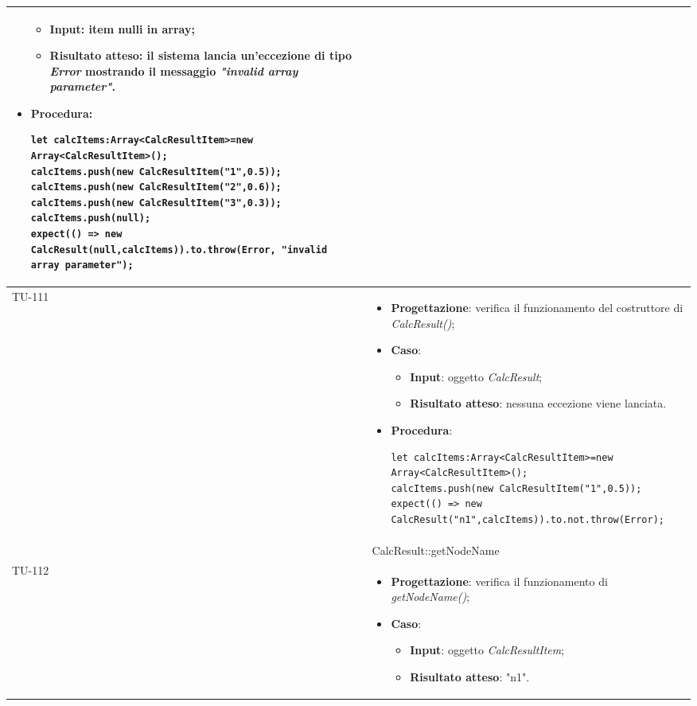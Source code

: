 \begin{longtable}{|C{1.5cm}|C{14.5cm}|}
\begin{itemize}
\begin{itemize}
		\item \textbf{Input}: item nulli in array;
		\item \textbf{Risultato atteso}: il sistema lancia un'eccezione di tipo \emph{Error} mostrando il messaggio \emph{"invalid array parameter"}.
	\end{itemize}
	\item \textbf{Procedura}:
	\begin{lstlisting}
let calcItems:Array<CalcResultItem>=new Array<CalcResultItem>();
calcItems.push(new CalcResultItem("1",0.5));
calcItems.push(new CalcResultItem("2",0.6));
calcItems.push(new CalcResultItem("3",0.3));
calcItems.push(null);
expect(() => new CalcResult(null,calcItems)).to.throw(Error, "invalid array parameter");
	\end{lstlisting}
\end{itemize}\\
\hline
{TU-111} &
\begin{itemize}
	\item \textbf{Progettazione}: verifica il funzionamento del costruttore di \emph{CalcResult()};
	\item \textbf{Caso}: 
	\begin{itemize}
		\item \textbf{Input}: oggetto \emph{CalcResult};
		\item \textbf{Risultato atteso}: nessuna eccezione viene lanciata.
	\end{itemize}
	\item \textbf{Procedura}:
	\begin{lstlisting}
let calcItems:Array<CalcResultItem>=new Array<CalcResultItem>();
calcItems.push(new CalcResultItem("1",0.5));
expect(() => new CalcResult("n1",calcItems)).to.not.throw(Error);
	\end{lstlisting}
\end{itemize}\\
\hline
{} & CalcResult::getNodeName
\\ \hline
{TU-112} &
\begin{itemize}
	\item \textbf{Progettazione}: verifica il funzionamento di \emph{getNodeName()};
	\item \textbf{Caso}: 
	\begin{itemize}
		\item \textbf{Input}: oggetto \emph{CalcResultItem};
		\item \textbf{Risultato atteso}: "n1".
	\end{itemize}

\end{itemize}
\end{longtable}
